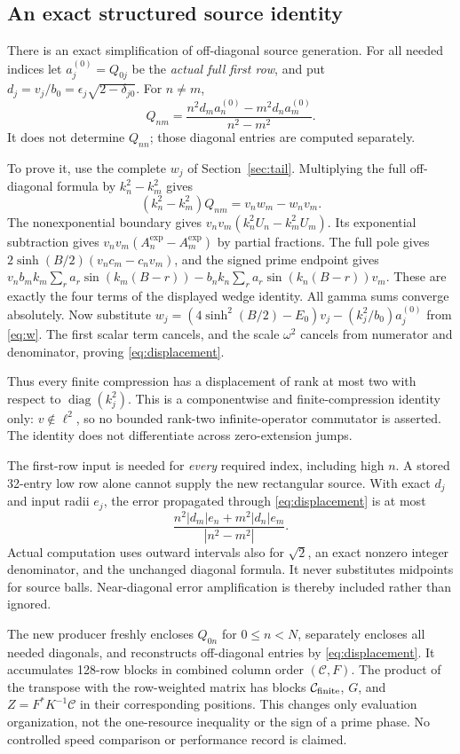 \documentclass[11pt]{article}
\begin{document}
\subsection{An exact structured source identity}
There is an exact simplification of off-diagonal source generation. For all needed indices let $a_j^{(0)}=Q_{0j}$ be the \emph{actual full first row}, and put $d_j=v_j/b_0=\epsilon_j\sqrt{2-\delta_{j0}}$. For $n\ne m$,
\begin{equation}
 Q_{nm}=\frac{n^2d_m a_n^{(0)}-m^2d_n a_m^{(0)}}{n^2-m^2}.\label{eq:displacement}
\end{equation}
It does not determine $Q_{nn}$; those diagonal entries are computed separately.

To prove it, use the complete $w_j$ of Section~\ref{sec:tail}. Multiplying the full off-diagonal formula by $k_n^2-k_m^2$ gives
\[
 (k_n^2-k_m^2)Q_{nm}=v_nw_m-w_nv_m.
\]
The nonexponential boundary gives $v_nv_m(k_n^2U_n-k_m^2U_m)$. Its exponential subtraction gives $v_nv_m(A_n^{\exp}-A_m^{\exp})$ by partial fractions. The full pole gives $2\sinh(B/2)(v_nc_m-c_nv_m)$, and the signed prime endpoint gives
$v_nb_mk_m\sum_ra_r\sin(k_m(B-r))-b_nk_n\sum_ra_r\sin(k_n(B-r))v_m$.
These are exactly the four terms of the displayed wedge identity. All gamma sums converge absolutely. Now substitute
$w_j=(4\sinh^2(B/2)-E_0)v_j-(k_j^2/b_0)a_j^{(0)}$ from \eqref{eq:w}. The first scalar term cancels, and the scale $\omega^2$ cancels from numerator and denominator, proving \eqref{eq:displacement}.

Thus every finite compression has a displacement of rank at most two with respect to $\operatorname{diag}(k_j^2)$. This is a componentwise and finite-compression identity only: $v\notin\ell^2$, so no bounded rank-two infinite-operator commutator is asserted. The identity does not differentiate across zero-extension jumps.

The first-row input is needed for \emph{every} required index, including high $n$. A stored 32-entry low row alone cannot supply the new rectangular source. With exact $d_j$ and input radii $e_j$, the error propagated through \eqref{eq:displacement} is at most
\[
 \frac{n^2|d_m|e_n+m^2|d_n|e_m}{|n^2-m^2|}.
\]
Actual computation uses outward intervals also for $\sqrt2$, an exact nonzero integer denominator, and the unchanged diagonal formula. It never substitutes midpoints for source balls. Near-diagonal error amplification is thereby included rather than ignored.

The new producer freshly encloses $Q_{0n}$ for $0\le n<N$, separately encloses all needed diagonals, and reconstructs off-diagonal entries by \eqref{eq:displacement}. It accumulates 128-row blocks in combined column order $(\mathcal C,F)$. The product of the transpose with the row-weighted matrix has blocks $\mathcal C_{\rm finite}$, $G$, and $Z=F^*K^{-1}\mathcal C$ in their corresponding positions. This changes only evaluation organization, not the one-resource inequality or the sign of a prime phase. No controlled speed comparison or performance record is claimed.
\end{document}
